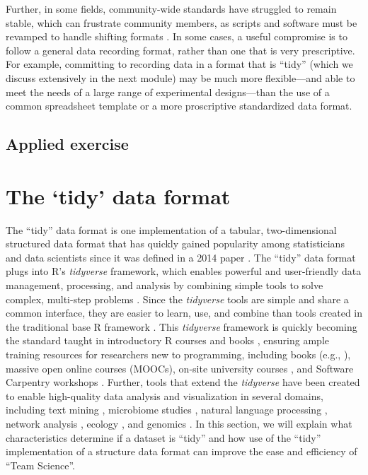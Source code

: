 \documentclass[]{tufte-book}
\begin{document}
Further, in some fields, community-wide standards have struggled to remain
stable, which can frustrate community members, as scripts and software must be
revamped to handle shifting formats \citep{buffalo2015bioinformatics, barga2011bioinformatics}. In some cases, a useful compromise is to follow a
general data recording format, rather than one that is very prescriptive. For
example, committing to recording data in a format that is ``tidy'' (which we
discuss extensively in the next module) may be much more flexible---and able to
meet the needs of a large range of experimental designs---than the use of a
common spreadsheet template or a more proscriptive standardized data format.

\hypertarget{applied-exercise}{%
\subsection{Applied exercise}\label{applied-exercise}}

\hypertarget{module3}{%
\section{The `tidy' data format}\label{module3}}

The ``tidy'' data format is one implementation of a tabular, two-dimensional
structured data format that has quickly gained popularity among statisticians
and data scientists since it was defined in a 2014 paper \citep{wickham2014tidy}.
The ``tidy'' data format plugs into R's \emph{tidyverse} framework, which enables
powerful and user-friendly data management, processing, and analysis by
combining simple tools to solve complex, multi-step problems
\citep{ross2017declutter, silge2016tidytext, wickham2016ggplot2, wickham2016r}.
Since the \emph{tidyverse} tools are simple and share a common interface, they are
easier to learn, use, and combine than tools created in the traditional base R
framework \citep{ross2017declutter, lowndes2017our, reviewer2017review, mcnamara2016state}. This \emph{tidyverse} framework is quickly becoming the standard
taught in introductory R courses and books \citep{hicks2017guide, baumer2015data, kaplan2018teaching, stander2017enthusing, reviewer2017review, mcnamara2016state}, ensuring ample training resources for researchers new to
programming, including books (e.g., \citep{baumer2017modern, lifesciencesR, wickham2016r}), massive open online courses (MOOCs), on-site university courses
\citep{baumer2015data, kaplan2018teaching, stander2017enthusing}, and Software
Carpentry workshops \citep{wilson2014software, pawlik2017developing}. Further, tools
that extend the \emph{tidyverse} have been created to enable high-quality data
analysis and visualization in several domains, including text mining
\citep{silge2017text}, microbiome studies \citep{mcmurdie2013phyloseq}, natural language
processing \citep{RJ-2017-035}, network analysis \citep{RJ-2017-023}, ecology
\citep{hsieh2016inext}, and genomics \citep{yin2012ggbio}. In this section, we will
explain what characteristics determine if a dataset is ``tidy'' and how use of the
``tidy'' implementation of a structure data format can improve the ease and
efficiency of ``Team Science''.
\end{document}
